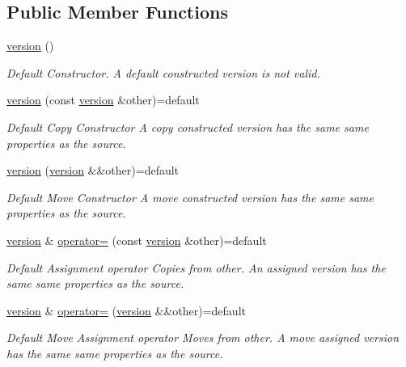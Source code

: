 \subsection*{Public Member Functions}
\begin{DoxyCompactItemize}
\item 
\hyperlink{classarchived_1_1version_a75950e89fdd7d100d9bb9c52be9750e5}{version} ()
\begin{DoxyCompactList}\small\item\em Default Constructor. A default constructed version is not valid. \end{DoxyCompactList}\item 
\hyperlink{classarchived_1_1version_ac511988e424b10abf26638b9aeb49934}{version} (const \hyperlink{classarchived_1_1version}{version} \&other)=default
\begin{DoxyCompactList}\small\item\em Default Copy Constructor A copy constructed version has the same same properties as the source. \end{DoxyCompactList}\item 
\hyperlink{classarchived_1_1version_a554be7a467115e99c8f2b6ea4aa8ea2d}{version} (\hyperlink{classarchived_1_1version}{version} \&\&other)=default
\begin{DoxyCompactList}\small\item\em Default Move Constructor A move constructed version has the same same properties as the source. \end{DoxyCompactList}\item 
\hyperlink{classarchived_1_1version}{version} \& \hyperlink{classarchived_1_1version_aa808a277ce1c999ac7472aaa1d77a7e3}{operator=} (const \hyperlink{classarchived_1_1version}{version} \&other)=default
\begin{DoxyCompactList}\small\item\em Default Assignment operator Copies from other. An assigned version has the same same properties as the source. \end{DoxyCompactList}\item 
\hyperlink{classarchived_1_1version}{version} \& \hyperlink{classarchived_1_1version_a8f5347b0b1207478ac2ec6219e5c315d}{operator=} (\hyperlink{classarchived_1_1version}{version} \&\&other)=default
\begin{DoxyCompactList}\small\item\em Default Move Assignment operator Moves from other. A move assigned version has the same same properties as the source. \end{DoxyCompactList}\end{DoxyCompactItemize}
